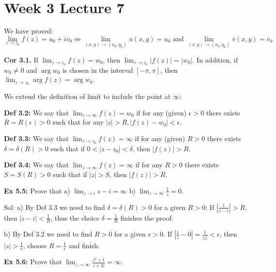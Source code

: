 \documentclass{article}
\begin{document}
\section*{Week 3 Lecture 7}
We have proved:
$$ \lim_{z\to z_0} f(z) = u_0 + iv_0 \iff \lim_{(x,y)\to(x_0, y_0)} u(x,y) = u_0 \text{ and } \lim_{(x,y)\to(x_0,y_0)}v(x,y)=v_0 $$

\textbf{Cor 3.1.} If $\lim_{z\to z_0} f(z) = w_0$, then $\lim_{z\to z_0} |f(z)| = |w_0|$. In addition, if $w_0 \neq 0$ and $\arg w_0$ is chosen in the interval $[-\pi, \pi]$, then $\lim_{z\to z_0} \arg f(z) = \arg w_0$.

We extend the definition of limit to include the point at $\infty$:

\textbf{Def 3.2:} We say that $\lim_{z\to\infty} f(z) = w_0$ if for any (given) $\epsilon > 0$ there exists $R = R(\epsilon) > 0$ such that for any $|z|>R, |f(z)-w_0|<\epsilon$.

\textbf{Def 3.3:} We say that $\lim_{z\to z_0} f(z) = \infty$ if for any (given) $R>0$ there exists $\delta = \delta(R) > 0$ such that if $0<|z-z_0|<\delta$, then $|f(z)|>R$.

\textbf{Def 3.4:} We say that $\lim_{z\to\infty}f(z)=\infty$ if for any $R>0$ there exists $S=S(R)>0$ such that if $|z|>S$, then $|f(z)|>R$.

\textbf{Ex 5.5:} Prove that a) $\lim_{z\to i} z-i = \infty$ b) $\lim_{z\to\infty} \frac{1}{z} = 0$.

Sol: a) By Def 3.3 we need to find $\delta = \delta(R) > 0$ for a given $R>0$: If $|\frac{1}{z-i}|>R$, then $|z-i|<\frac{1}{R}$, thus the choice $\delta = \frac{1}{R}$ finishes the proof.

b) By Def 3.2 we need to find $R>0$ for a given $\epsilon > 0$. If $|\frac{1}{z} - 0| = \frac{1}{|z|} < \epsilon$, then $|z|>\frac{1}{\epsilon}$, choose $R=\frac{1}{\epsilon}$ and finish.

\textbf{Ex 5.6:} Prove that $\lim_{z\to\infty} \frac{z^2+1}{z+2i} = \infty$.
\end{document}
